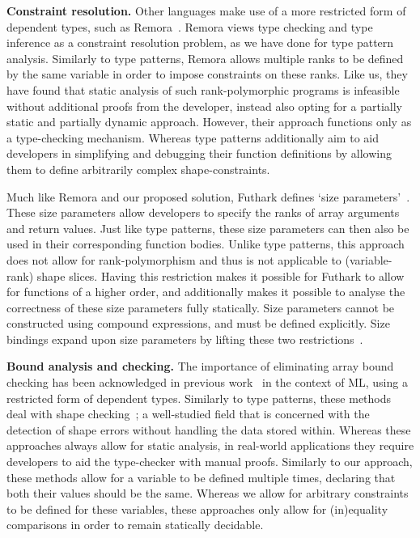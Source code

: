\textbf{Constraint resolution.}
Other languages make use of a more restricted form of dependent types, such as Remora~\cite{remora, remora-polymorphism}.
Remora views type checking and type inference as a constraint resolution problem, as we have done for type pattern analysis.
Similarly to type patterns, Remora allows multiple ranks to be defined by the same variable in order to impose constraints on these ranks.
Like us, they have found that static analysis of such rank-polymorphic programs is infeasible without additional proofs from the developer, instead also opting for a partially static and partially dynamic approach.
However, their approach functions only as a type-checking mechanism.
Whereas type patterns additionally aim to aid developers in simplifying and debugging their function definitions by allowing them to define arbitrarily complex shape-constraints.

Much like Remora and our proposed solution, Futhark defines `size parameters'~\cite{futhark, futhark-size-parameters}.
These size parameters allow developers to specify the ranks of array arguments and return values.
Just like type patterns, these size parameters can then also be used in their corresponding function bodies.
Unlike type patterns, this approach does not allow for rank-polymorphism and thus is not applicable to (variable-rank) shape slices.
Having this restriction makes it possible for Futhark to allow for functions of a higher order, and additionally makes it possible to analyse the correctness of these size parameters fully statically.
Size parameters cannot be constructed using compound expressions, and must be defined explicitly.
Size bindings expand upon size parameters by lifting these two restrictions~\cite{size-dependent-types}.

\textbf{Bound analysis and checking.}
The importance of eliminating array bound checking has been acknowledged in previous work~\cite{dependent-types-bounds, refinement-types} in the context of ML, using a restricted form of dependent types.
Similarly to type patterns, these methods deal with shape checking~\cite{shape-checking}; a well-studied field that is concerned with the detection of shape errors without handling the data stored within.
Whereas these approaches always allow for static analysis, in real-world applications they require developers to aid the type-checker with manual proofs.
Similarly to our approach, these methods allow for a variable to be defined multiple times, declaring that both their values should be the same.
Whereas we allow for arbitrary constraints to be defined for these variables, these approaches only allow for (in)equality comparisons in order to remain statically decidable.

